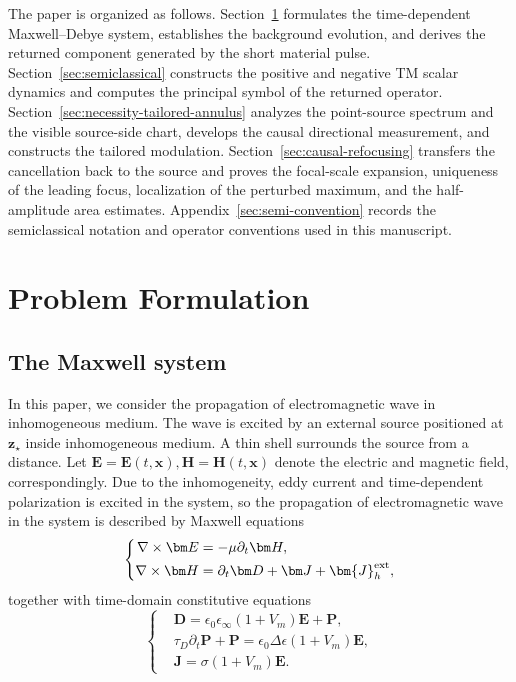 \documentclass[11pt,reqno]{amsart}
\numberwithin{equation}{section}
\begin{document}
The paper is organized as follows. Section~\ref{sec:prb-formulation} formulates the time-dependent Maxwell--Debye system, establishes the background evolution, and derives the returned component generated by the short material pulse. Section~\ref{sec:semiclassical} constructs the positive and negative TM scalar dynamics and computes the principal symbol of the returned operator. Section~\ref{sec:necessity-tailored-annulus} analyzes the point-source spectrum and the visible source-side chart, develops the causal directional measurement, and constructs the tailored modulation. Section~\ref{sec:causal-refocusing} transfers the cancellation back to the source and proves the focal-scale expansion, uniqueness of the leading focus, localization of the perturbed maximum, and the half-amplitude area estimates. Appendix~\ref{sec:semi-convention} records the semiclassical notation and operator conventions used in this manuscript.



\section{Problem Formulation}\label{sec:prb-formulation}



\subsection{The Maxwell system}

In this paper, we consider the propagation of electromagnetic wave in inhomogeneous medium. The wave is excited by an external source positioned at $\bm{z}_\star$ inside inhomogeneous medium. A thin shell surrounds the source from a distance. Let $\bm{E}=\bm{E}(t, \bm{x}), \bm{H}=\bm{H}(t, \bm{x})$ denote the electric and magnetic field, correspondingly. Due to the inhomogeneity, eddy current and time-dependent polarization is excited in the system, so the propagation of electromagnetic wave in the system is described by Maxwell equations
\begin{equation}\label{eq:maxwellmod}
\left\{
\begin{aligned}
\nabla\times\bm E &= -\mu\partial_t\bm H, \\
\nabla\times\bm H &= \partial_t\bm D+\bm J + \bm{J}_h^{\rm ext},
\end{aligned}
\right.
\end{equation}
together with time-domain constitutive equations
\begin{equation}\label{eq:modconstitutive}
\left\{
\begin{aligned}
&\bm D=\epsilon_0\epsilon_\infty(1+V_m)\bm E+\bm P, \\
&\tau_D\partial_t\bm P+\bm P = \epsilon_0\Delta\epsilon(1+V_m)\bm E, \\
&\bm J=\sigma(1+V_m)\bm E.
\end{aligned}
\right.
\end{equation}
\end{document}
